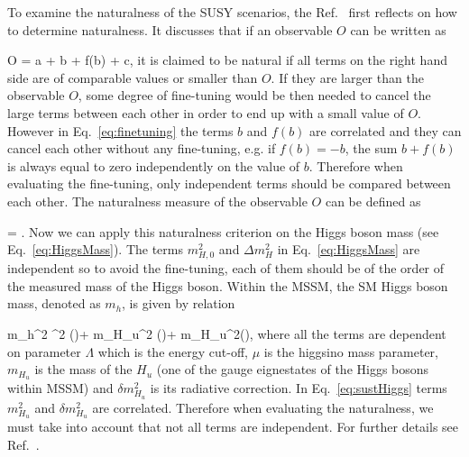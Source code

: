 To examine the naturalness of the SUSY scenarios, the Ref.~\cite{Baer:2016bwh} first reflects on how to determine naturalness.  It discusses that if an observable $O$ can be written as

{
O = a + b + f(b) + c,
}
it is claimed to be natural if all terms on the right hand side are of comparable values or smaller than $O$. If they are larger than the observable $O$, some degree of fine-tuning would be then needed to cancel the large terms between each other in order to end up with a small value of $O$. However in Eq.~\ref{eq:finetuning} the terms $b$ and $f(b)$ are correlated and they can cancel each other without any fine-tuning, e.g. if $f(b) = -b$, the sum $b+f(b)$ is always equal to zero independently on the value of $b$. Therefore when evaluating the fine-tuning, only independent terms should be compared between each other. The naturalness measure of the observable $O$ can be defined as 

{
\Delta = .
}
Now we can apply this naturalness criterion on the Higgs boson mass (see Eq.~\ref{eq:HiggsMass}).  The terms $m_{H,0}^{2}$ and $\Delta m_{H}^{2}$ in Eq.~\ref{eq:HiggsMass} are independent so to avoid the fine-tuning, each of them should be of the order of the measured mass of the Higgs boson. Within the MSSM, the SM Higgs boson mass, denoted as $m_{h}$, is given by relation

{
m_{h}^{2}  \mu^{2} (\Lambda)+ m_{H_{u}}^{2} (\Lambda)+ \delta m_{H_{u}}^{2}(\Lambda),
}
where all the terms are dependent on parameter $\Lambda$ which is the energy cut-off, $\mu$ is the higgsino mass parameter, $m_{H_{u}}$ is the mass of the $H_{u}$ (one of the gauge eignestates of the Higgs bosons within MSSM)  and $\delta m_{H_{u}}^{2}$ is its radiative correction. In Eq.~\ref{eq:sustHiggs} terms $m_{H_{u}}^{2}$ and  $\delta m_{H_{u}}^{2}$ are correlated. Therefore when evaluating the naturalness, we must take into account that not all terms are independent. For further details see Ref.~\cite{Baer:2016bwh}.




